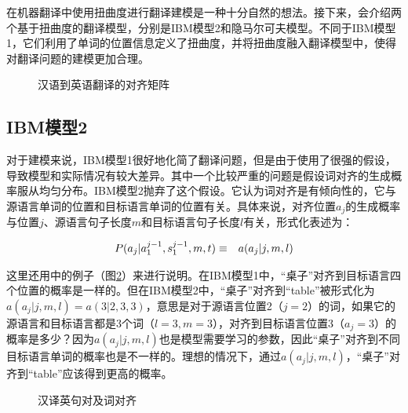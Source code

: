 \parinterval 在机器翻译中使用扭曲度进行翻译建模是一种十分自然的想法。接下来，会介绍两个基于扭曲度的翻译模型，分别是IBM模型2和隐马尔可夫模型。不同于IBM模型1，它们利用了单词的位置信息定义了扭曲度，并将扭曲度融入翻译模型中，使得对翻译问题的建模更加合理。

\begin{figure}[htp]
    \centering

    \caption{汉语到英语翻译的对齐矩阵}
    \label{fig:6-2}
\end{figure}

\subsection{IBM模型2}

\parinterval 对于建模来说，IBM模型1很好地化简了翻译问题，但是由于使用了很强的假设，导致模型和实际情况有较大差异。其中一个比较严重的问题是假设词对齐的生成概率服从均匀分布。IBM模型2抛弃了这个假设。它认为词对齐是有倾向性的，它与源语言单词的位置和目标语言单词的位置有关。具体来说，对齐位置$a_j$的生成概率与位置$j$、源语言句子长度$m$和目标语言句子长度$l$有关，形式化表述为：

\begin{eqnarray}
{P}(a_j|a_1^{j-1},s_1^{j-1},m,{t}) & \equiv & a(a_j|j,m,l)
\label{eq:6-1}
\end{eqnarray}

\parinterval 这里还用{\chapterfive}中的例子（图\ref{fig:6-3}）来进行说明。在IBM模型1中，“桌子”对齐到目标语言四个位置的概率是一样的。但在IBM模型2中，“桌子”对齐到“table”被形式化为$a(a_j |j,m,l)=a(3|2,3,3)$，意思是对于源语言位置2（$j=2$）的词，如果它的源语言和目标语言都是3个词（$l=3,m=3$），对齐到目标语言位置3（$a_j=3$）的概率是多少？因为$a(a_j|j,m,l)$也是模型需要学习的参数，因此“桌子”对齐到不同目标语言单词的概率也是不一样的。理想的情况下，通过$a(a_j|j,m,l)$，“桌子”对齐到“table”应该得到更高的概率。

\begin{figure}[htp]
    \centering

    \caption{汉译英句对及词对齐}
    \label{fig:6-3}
\end{figure}

